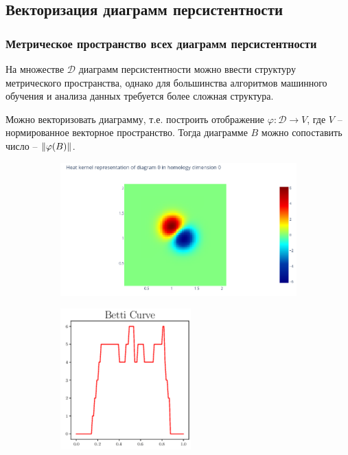 \documentclass{beamer}
\DeclarePairedDelimiter\norm{\lVert}{\rVert}%
\begin{document}
		\subsection{Векторизация диаграмм персистентности}
		\begin{frame}
			\frametitle{Метрическое пространство всех диаграмм персистентности}
			На множестве $\mathcal{D}$ диаграмм персистентности можно ввести структуру метрического пространства, однако для большинства алгоритмов машинного обучения и анализа данных требуется более сложная структура.
			
			Можно векторизовать диаграмму, т.е. построить отображение $ \varphi: \mathcal{D} \to V $, где $V$ -- нормированное векторное пространство. Тогда диаграмме $B$ можно сопоставить число -- $\norm{\varphi(B)}$.
			\begin{figure}[!htbp]
				\centering
				\begin{subfigure}{0.35\textwidth}
					\includegraphics[width=\linewidth]{vectorizationImage.png}
				\end{subfigure}\hfil %
				\begin{subfigure}{0.23\textwidth}
					\includegraphics[width=\linewidth]{betti-curve.png}

\end{subfigure}
\end{figure}
\end{frame}
\end{document}
